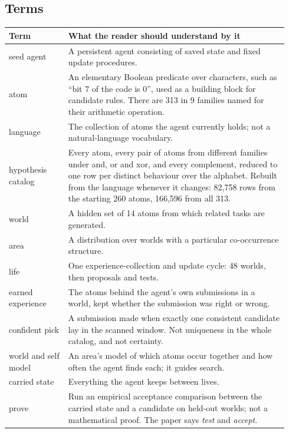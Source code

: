\documentclass[11pt]{article}
\begin{document}
\subsection{Terms}

\begin{center}
\small
\begin{tabular}{p{0.2\linewidth}p{0.74\linewidth}}
\toprule
Term & What the reader should understand by it \\
\midrule
seed agent & A persistent agent consisting of saved state and fixed update procedures. \\
atom & An elementary Boolean predicate over characters, such as ``bit 7 of the code is 0'', used as a building block for candidate rules. There are 313 in 9 families named for their arithmetic operation. \\
language & The collection of atoms the agent currently holds; not a natural-language vocabulary. \\
hypothesis catalog & Every atom, every pair of atoms from different families under and, or and xor, and every complement, reduced to one row per distinct behaviour over the alphabet. Rebuilt from the language whenever it changes: 82,758 rows from the starting 260 atoms, 166,596 from all 313. \\
world & A hidden set of 14 atoms from which related tasks are generated. \\
area & A distribution over worlds with a particular co-occurrence structure. \\
life & One experience-collection and update cycle: 48 worlds, then proposals and tests. \\
earned experience & The atoms behind the agent's own submissions in a world, kept whether the submission was right or wrong. \\
confident pick & A submission made when exactly one consistent candidate lay in the scanned window. Not uniqueness in the whole catalog, and not certainty. \\
world and self model & An area's model of which atoms occur together and how often the agent finds each; it guides search. \\
carried state & Everything the agent keeps between lives. \\
prove & Run an empirical acceptance comparison between the carried state and a candidate on held-out worlds; not a mathematical proof. The paper says \emph{test} and \emph{accept}. \\
\bottomrule
\end{tabular}
\end{center}
\end{document}
